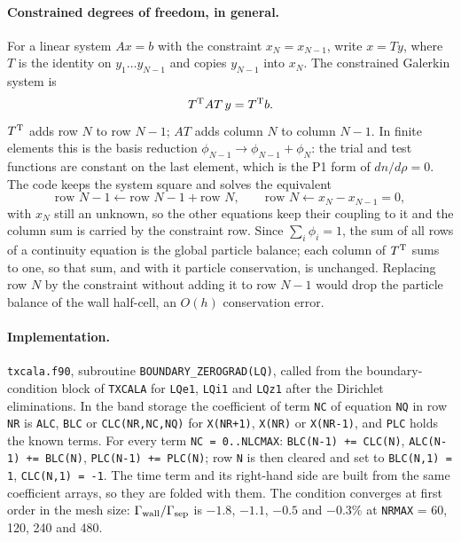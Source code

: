 \documentclass[11pt]{article}
\def\r#1{{\rm#1}}
\begin{document}
\paragraph{Constrained degrees of freedom, in general.}
For a linear system $A x = b$ with the constraint $x_N = x_{N-1}$, write
$x = T y$, where $T$ is the identity on $y_1\dots y_{N-1}$ and copies $y_{N-1}$
into $x_N$.  The constrained Galerkin system is
\begin{equation}
  T^\r{T} A T\, y = T^\r{T} b .
\end{equation}
$T^\r{T}$ adds row $N$ to row $N-1$; $AT$ adds column $N$ to column $N-1$.  In
finite elements this is the basis reduction $\phi_{N-1}\to\phi_{N-1}+\phi_N$:
the trial and test functions are constant on the last element, which is the
P1 form of $dn/d\rho=0$.  The code keeps the system square and solves the
equivalent
\begin{equation}
  \mbox{row } N-1 \leftarrow \mbox{row } N-1 + \mbox{row } N,\qquad
  \mbox{row } N \leftarrow x_N - x_{N-1} = 0 ,
\end{equation}
with $x_N$ still an unknown, so the other equations keep their coupling to it and
the column sum is carried by the constraint row.
Since $\sum_i\phi_i = 1$, the sum of all rows of a continuity equation is the
global particle balance; each column of $T^\r{T}$ sums to one, so that sum,
and with it particle conservation, is unchanged.  Replacing row $N$ by the
constraint without adding it to row $N-1$ would drop the particle balance of the
wall half-cell, an $O(h)$ conservation error.

\paragraph{Implementation.}
\texttt{txcala.f90}, subroutine \texttt{BOUNDARY\_ZEROGRAD(LQ)}, called from the
boundary-condition block of \texttt{TXCALA} for \texttt{LQe1}, \texttt{LQi1} and
\texttt{LQz1} after the Dirichlet eliminations.  In the band storage the
coefficient of term \texttt{NC} of equation \texttt{NQ} in row \texttt{NR} is
\texttt{ALC}, \texttt{BLC} or \texttt{CLC}\texttt{(NR,NC,NQ)} for
\texttt{X(NR+1)}, \texttt{X(NR)} or \texttt{X(NR-1)}, and \texttt{PLC} holds the
known terms.  For every term \texttt{NC = 0..NLCMAX}:
\texttt{BLC(N-1)~+=~CLC(N)}, \texttt{ALC(N-1)~+=~BLC(N)},
\texttt{PLC(N-1)~+=~PLC(N)}; row \texttt{N} is then cleared and set to
\texttt{BLC(N,1) = 1}, \texttt{CLC(N,1) = -1}.  The time term and its
right-hand side are built from the same coefficient arrays, so they are folded
with them.  The condition converges at first order in the mesh size:
$\Gamma_\r{wall}/\Gamma_\r{sep}$ is $-1.8$, $-1.1$, $-0.5$ and $-0.3$\% at
\texttt{NRMAX} = 60, 120, 240 and 480.
\end{document}
